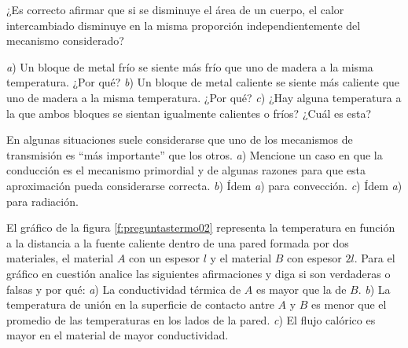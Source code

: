 %
\begin{center}
\end{center}
%
\begin{Exercise}
  ¿Es correcto afirmar que si se disminuye el área de un cuerpo, el calor intercambiado disminuye en la misma proporción independientemente del mecanismo considerado?
\end{Exercise}
%
\begin{Exercise}
  \textit{a}) Un bloque de metal frío se siente más frío que uno de madera a la misma temperatura. ¿Por qué? \textit{b}) Un bloque de metal caliente se siente más caliente que uno de madera a la misma temperatura. ¿Por qué? \textit{c}) ¿Hay alguna temperatura a la que ambos bloques se sientan igualmente calientes o fríos? ¿Cuál es esta?
\end{Exercise}
%
\begin{Exercise}
  En algunas situaciones suele considerarse que uno de los mecanismos de transmisión es ``más importante'' que los otros. \textit{a}) Mencione un caso en que la conducción es el mecanismo primordial y de algunas razones para que esta aproximación pueda considerarse correcta. \textit{b}) Ídem \textit{a}) para convección. \textit{c}) Ídem \textit{a}) para radiación.
\end{Exercise}
%
\begin{Exercise}\label{p:preguntastermo02}
  {}{}
  El gráfico de la figura \ref{f:preguntastermo02} representa la temperatura en función a la distancia a la fuente caliente dentro de una pared formada por dos materiales, el material $A$ con un espesor $l$ y el material $B$ con espesor $2l$. Para el gráfico en cuestión analice las siguientes afirmaciones y diga si son verdaderas o falsas y por qué: \textit{a}) La conductividad térmica de $A$ es mayor que la de $B$. \textit{b}) La temperatura de unión en la superficie de contacto antre $A$ y $B$ es menor que el promedio de las temperaturas en los lados de la pared. \textit{c}) El flujo calórico es mayor en el material de mayor conductividad.
\end{Exercise}
